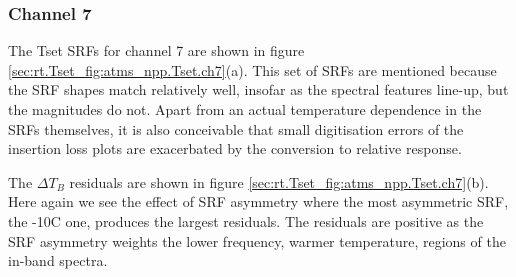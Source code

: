 \subsubsection{Channel 7}
The Tset SRFs for channel 7 are shown in figure \ref{sec:rt.Tset_fig:atms_npp.Tset.ch7}(a). This set of SRFs are mentioned because the SRF shapes match relatively well, insofar as the spectral features line-up, but the magnitudes do not. Apart from an actual temperature dependence in the SRFs themselves, it is also conceivable that small digitisation errors of the insertion loss plots are exacerbated by the conversion to relative response.

The $\Delta T_B$ residuals are shown in figure \ref{sec:rt.Tset_fig:atms_npp.Tset.ch7}(b). Here again we see the effect of SRF asymmetry where the most asymmetric SRF, the -10\textdegree{}C one, produces the largest residuals. The residuals are positive as the SRF asymmetry weights the lower frequency, warmer temperature, regions of the in-band spectra. 

